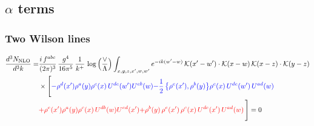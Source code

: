 \documentclass[9pt]{article}
\numberwithin{equation}{section}
\begin{document}
\subsection{$\alpha$ terms}
\subsubsection{Two Wilson lines}
\begin{align}
\frac{d^{3}N_{\rm NLO}}{d^{3}k}= & \frac{i\,f^{abc}}{(2\pi)^{3}}\,\frac{g^{4}}{16\pi^{5}}\,\frac{1}{k^{+}}\,\log\Big(\frac{\vee}{\Lambda}\Big)\int_{x,y,z,x',w,w'}e^{-ik(w'-w)}\,\mathcal{K}(x'-w')\cdot\mathcal{K}(x-w)\,\mathcal{K}(x-z)\cdot\mathcal{K}(y-z)\notag\\
&\times\Bigg[{\color{blue}-\rho^{d}(x') \rho^{a}(y) \rho^{c}(x)\,U^{d e}(w') U^{e b}(w)}{\color{blue}-\frac{1}{2}\,\big\{\rho^{e}(x'),\rho^{b}(y)\big\}\rho^{c}(x)\,U^{de}(w')\,U^{ad}(w)}\notag \\ & {\color{red}+\rho^{e}(x') \rho^{a}(y) \rho^{c}(x)\, U^{d b}(w) U^{e d}(x')}{\color{red}+\rho^{b}(y)\,\rho^{e}(x')\,\rho^{c}(x)\,U^{de}(x')\,U^{ad}(w)}\,\Bigg] = 0
\end{align}
\end{document}
